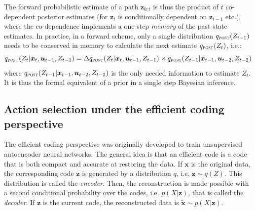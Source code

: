 \documentclass[12pt,twoside,openright]{article}
\begin{document}
The forward probabilistic estimate of a path $\boldsymbol{z}_{0:t}$ is thus the product of $t$ co-dependent posterior estimates (for $\boldsymbol{z}_t$ is conditionally dependent on $\boldsymbol{z}_{t-1}$ etc.), where the co-dependence implements a one-step \emph{memory} of the past state estimates. In practice, in a forward scheme, only a single distribution $q_\text{\sc post}(Z_{t-1})$ needs to be conserved in memory to calculate the next estimate $q_\text{\sc post}(Z_t)$, i.e.:
$$q_\text{\sc post}(Z_t|\boldsymbol{x}_t,\boldsymbol{u}_{t-1}, Z_{t-1}) = 
\Delta q_\text{\sc post}(Z_t|\boldsymbol{x}_t,\boldsymbol{u}_{t-1}, Z_{t-1}) 
\times q_\text{\sc post}(Z_{t-1}|\boldsymbol{x}_{t-1},\boldsymbol{u}_{t-2}, Z_{t-2})$$
where $q_\text{\sc post}(Z_{t-1}|\boldsymbol{x}_{t-1},\boldsymbol{u}_{t-2}, Z_{t-2})$ is the only needed information to estimate $Z_t$. It is thus the formal equivalent of a prior in a single step Bayesian inference.

\subsection{Action selection under the efficient coding perspective}
The efficient coding perspective \cite{hinton1994autoencoders} was originally developed 
to train unsupervised autoencoder neural networks. The general idea is that an efficient code 
is a code that is both compact and accurate at restoring the data. 
If $\boldsymbol{x}$ is the original data, the corresponding code $\boldsymbol{z}$ is generated by a distribution $q$, i.e. $\boldsymbol{z} \sim q(Z)$. This distribution is called the \emph{encoder}. Then, the reconstruction is made possible with a second conditional probability over the codes, i.e. $p(X|\boldsymbol{z})$, that is called the \emph{decoder}. If $\boldsymbol{z}$ is the current code, the reconstructed data is $\tilde{\boldsymbol{x}} \sim p(X|\boldsymbol{z})$. 
\end{document}
